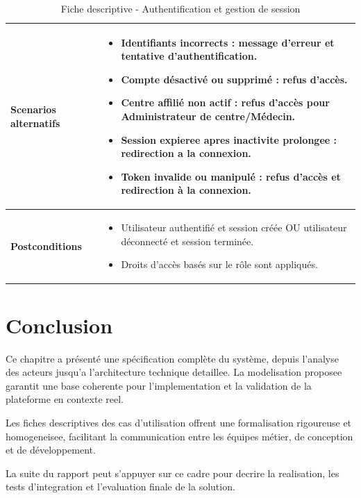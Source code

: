 \begin{table}[H]
\begin{tabular}{|p{5cm}|p{10cm}|}
\textbf{Scenarios alternatifs} &
\begin{itemize}
\item Identifiants incorrects : message d'erreur et tentative d'authentification.
\item Compte désactivé ou supprimé : refus d'accès.
\item Centre affilié non actif : refus d'accès pour Administrateur de centre/Médecin.
\item Session expieree apres inactivite prolongee : redirection a la connexion.
\item Token invalide ou manipulé : refus d'accès et redirection à la connexion.
\end{itemize} \\ \hline

\textbf{Postconditions} &
\begin{itemize}
\item Utilisateur authentifié et session créée OU utilisateur déconnecté et session terminée.
\item Droits d'accès basés sur le rôle sont appliqués.
\end{itemize} \\ \hline
\end{tabular}
\caption{Fiche descriptive - Authentification et gestion de session}
\end{table}

\section{Conclusion}
Ce chapitre a présenté une spécification complète du système, depuis l'analyse des acteurs
jusqu'a l'architecture technique detaillee. La modelisation proposee garantit une base coherente
pour l'implementation et la validation de la plateforme en contexte reel.

Les fiches descriptives des cas d'utilisation offrent une formalisation rigoureuse et homogeneisee,
facilitant la communication entre les équipes métier, de conception et de développement.

La suite du rapport peut s'appuyer sur ce cadre pour decrire la realisation,
les tests d'integration et l'evaluation finale de la solution.